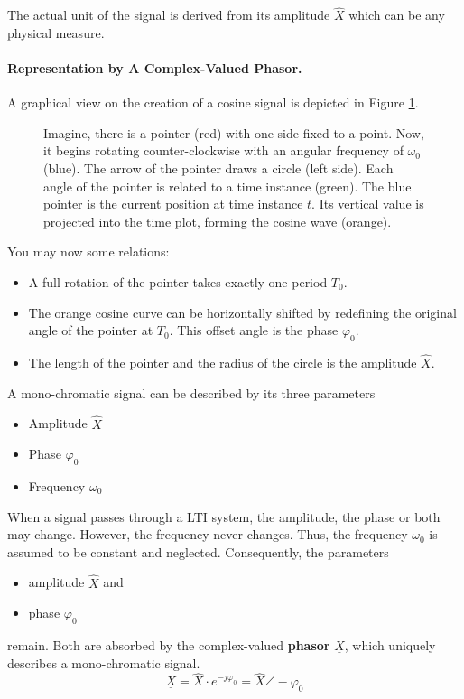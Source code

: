 \begin{refsection}
The actual unit of the signal is derived from its amplitude $\hat{X}$ which can be any physical measure.

\paragraph{Representation by A Complex-Valued Phasor.}

A graphical view on the creation of a cosine signal is depicted in Figure \ref{fig:ch02:cos_creation}.

\begin{figure}[H]
	\caption{Imagine, there is a pointer (red) with one side fixed to a point. Now, it begins rotating counter-clockwise with an angular frequency of $\omega_0$ (blue). The arrow of the pointer draws a circle (left side). Each angle of the pointer is related to a time instance (green). The blue pointer is the current position at time instance $t$. Its vertical value is projected into the time plot, forming the cosine wave (orange).}
	\label{fig:ch02:cos_creation}
\end{figure}

You may now some relations:
\begin{itemize}
	\item A full rotation of the pointer takes exactly one period $T_0$.
	\item The orange cosine curve can be horizontally shifted by redefining the original angle of the pointer at $T_0$. This offset angle is the phase $\varphi_0$.
	\item The length of the pointer and the radius of the circle is the amplitude $\hat{X}$.
\end{itemize}

A mono-chromatic signal can be described by its three parameters
\begin{itemize}
	\item Amplitude $\hat{X}$
	\item Phase $\varphi_0$
	\item Frequency $\omega_0$
\end{itemize}

When a signal passes through a \ac{LTI} system, the amplitude, the phase or both may change. However, the frequency never changes. Thus, the frequency $\omega_0$ is assumed to be constant and neglected. Consequently, the parameters
\begin{itemize}
	\item amplitude $\hat{X}$ and
	\item phase $\varphi_0$
\end{itemize}
remain. Both are absorbed by the complex-valued  \textbf{phasor} $\underline{X}$, which uniquely describes a mono-chromatic signal.
\begin{equation}
	\underline{X} = \hat{X} \cdot e^{-j \varphi_0} = \hat{X} \angle -\varphi_0
\end{equation}


\end{refsection}
